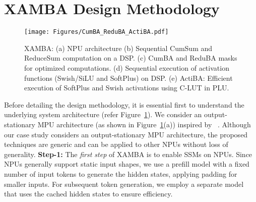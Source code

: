 \section{XAMBA Design Methodology}\label{sec_xamba_design}

\begin{figure}[t!]
\begin{center}
\texttt{[image: Figures/CumBA\_ReduBA\_ActiBA.pdf]}
\end{center}
\caption{XAMBA:
(a) NPU architecture
(b) Sequential CumSum and ReduceSum computation on a DSP.
(c) CumBA and ReduBA masks for optimized computations.
(d) Sequential execution of activation functions (Swish/SiLU and SoftPlus) on DSP.
(e) ActiBA: Efficient execution of SoftPlus and Swish activations using C-LUT in PLU.}\label{fig:xamba}
\end{figure}


Before detailing the design methodology, it is essential first to understand the underlying system architecture (refer Figure~\ref{fig:xamba}). We consider an output-stationary MPU architecture (as shown in Figure~\ref{fig:xamba}(a)) inspired by ~\cite{flexnn}. 
Although our case study considers an output-stationary MPU architecture, the proposed techniques are generic and can be applied to other NPUs without loss of generality. \textbf{Step-1:} The \textit{first step} of XAMBA is to enable SSMs on NPUs. Since NPUs generally support static input shapes, we use a prefill model with a fixed number of input tokens to generate the hidden states, applying padding for smaller inputs. For subsequent token generation, we employ a separate model that uses the cached hidden states to ensure efficiency. 


